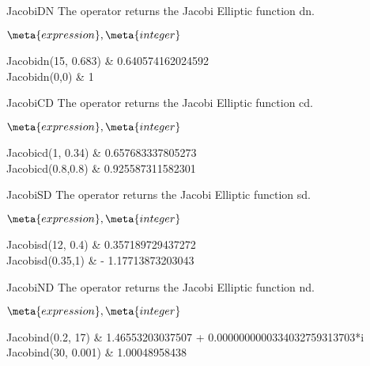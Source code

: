 \begin{Operator}{JacobiDN}
The  operator returns the Jacobi Elliptic function dn.

\begin{Syntax}
\(\meta{expression},\meta{integer}\)
\end{Syntax}

\begin{Examples}
Jacobidn(15, 0.683)     & 0.640574162024592 \\
Jacobidn(0,0)           & 1 \\
\end{Examples}

\end{Operator}

\begin{Operator}{JacobiCD}
The  operator returns the Jacobi Elliptic function cd.

\begin{Syntax}
\(\meta{expression},\meta{integer}\)
\end{Syntax}

\begin{Examples}
Jacobicd(1, 0.34)       & 0.657683337805273 \\
Jacobicd(0.8,0.8)       & 0.925587311582301 \\
\end{Examples}

\end{Operator}

\begin{Operator}{JacobiSD}
The  operator returns the Jacobi Elliptic function sd.

\begin{Syntax}
\(\meta{expression},\meta{integer}\)
\end{Syntax}

\begin{Examples}
Jacobisd(12, 0.4)       & 0.357189729437272    \\
Jacobisd(0.35,1)        &  - 1.17713873203043  \\
\end{Examples}

\end{Operator}

\begin{Operator}{JacobiND}
The  operator returns the Jacobi Elliptic function nd.

\begin{Syntax}
\(\meta{expression},\meta{integer}\)
\end{Syntax}

\begin{Examples}
Jacobind(0.2, 17) & 1.46553203037507 + 0.0000000000334032759313703*i \\
Jacobind(30, 0.001)      & 1.00048958438  \\
\end{Examples}

\end{Operator}

